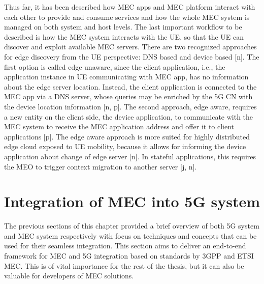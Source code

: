 \documentclass[12pt,a4paper,twoside]{report}
\begin{document}
Thus far, it has been described how MEC apps and MEC platform interact with each other to provide and consume services and how the whole MEC system is managed on both system and host levels. The last important workflow to be described is how the MEC system interacts with the UE, so that the UE can discover and exploit available MEC servers.  There are two recognized approaches for edge discovery from the UE perspective: DNS based and device based [n]. The first option is called edge unaware, since the client application, i.e., the application instance in UE communicating with MEC app, has no information about the edge server location. Instead, the client application is connected to the MEC app via a DNS server, whose queries may be enriched by the 5G CN with the device location information [n, p]. The second approach, edge aware, requires a new entity on the client side, the device application, to communicate with the MEC system to receive the MEC application address and offer it to client applications [p]. The edge aware approach is more suited for highly distributed edge cloud exposed to UE mobility, because it allows for informing the device application about change of edge server [n]. In stateful applications, this requires the MEO to trigger context migration to another server [j, n].

\section{Integration of MEC into 5G system}
The previous sections of this chapter provided a brief overview of both 5G system and MEC system respectively with focus on techniques and concepts that can be used for their seamless integration. This section aims to deliver an end-to-end framework for MEC and 5G integration based on standards by 3GPP and ETSI MEC. This is of vital importance for the rest of the thesis, but it can also be valuable for developers of MEC solutions. 
\end{document}
